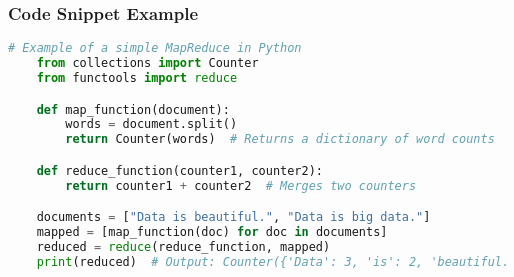 \documentclass[aspectratio=169]{beamer}
\begin{document}
\begin{frame}[fragile]
    \frametitle{Code Snippet Example}
    \begin{lstlisting}[language=Python]
    # Example of a simple MapReduce in Python
    from collections import Counter
    from functools import reduce

    def map_function(document):
        words = document.split()
        return Counter(words)  # Returns a dictionary of word counts

    def reduce_function(counter1, counter2):
        return counter1 + counter2  # Merges two counters

    documents = ["Data is beautiful.", "Data is big data."]
    mapped = [map_function(doc) for doc in documents]
    reduced = reduce(reduce_function, mapped)
    print(reduced)  # Output: Counter({'Data': 3, 'is': 2, 'beautiful.': 1, 'big': 1})
    \end{lstlisting}
\end{frame}
\end{document}
